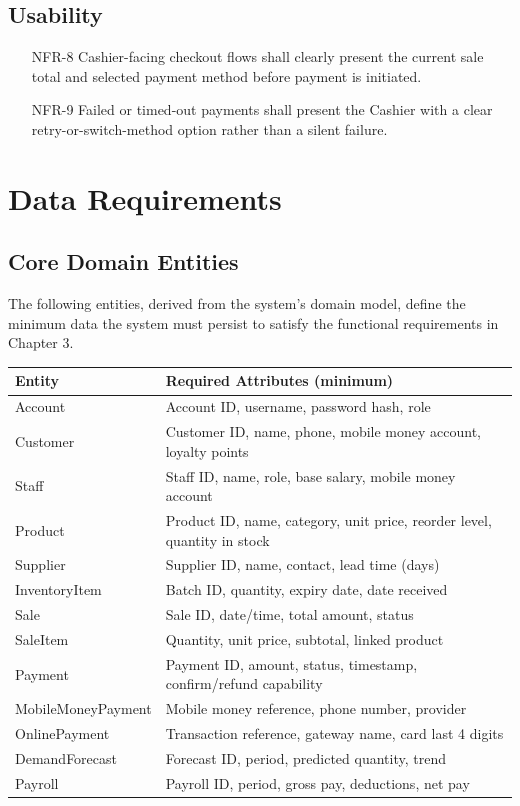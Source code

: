 \documentclass[11pt,a4paper]{report}
\begin{document}
\section{Usability}
\begin{itemize}[itemsep=2pt]
    \item[NFR-8] Cashier-facing checkout flows shall clearly present the current sale total and selected payment method before payment is initiated.
    \item[NFR-9] Failed or timed-out payments shall present the Cashier with a clear retry-or-switch-method option rather than a silent failure.
\end{itemize}

\chapter{Data Requirements}

\section{Core Domain Entities}
The following entities, derived from the system's domain model, define the minimum data the system must persist to satisfy the functional requirements in Chapter 3.

\begin{longtable}{L{2.8cm} L{11.2cm}}
\toprule
\textbf{Entity} & \textbf{Required Attributes (minimum)} \\
\midrule
\endhead
Account & Account ID, username, password hash, role \\
Customer & Customer ID, name, phone, mobile money account, loyalty points \\
Staff & Staff ID, name, role, base salary, mobile money account \\
Product & Product ID, name, category, unit price, reorder level, quantity in stock \\
Supplier & Supplier ID, name, contact, lead time (days) \\
InventoryItem & Batch ID, quantity, expiry date, date received \\
Sale & Sale ID, date/time, total amount, status \\
SaleItem & Quantity, unit price, subtotal, linked product \\
Payment & Payment ID, amount, status, timestamp, confirm/refund capability \\
MobileMoneyPayment & Mobile money reference, phone number, provider \\
OnlinePayment & Transaction reference, gateway name, card last 4 digits \\
DemandForecast & Forecast ID, period, predicted quantity, trend \\
Payroll & Payroll ID, period, gross pay, deductions, net pay \\
\bottomrule
\end{longtable}
\end{document}
